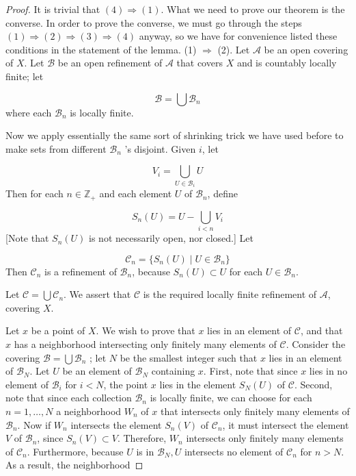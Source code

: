 \begin{proof}
 It is trivial that \((4) \Rightarrow (1)\). What we need to prove our theorem is the converse. In order to prove the converse, we must go through the steps \((1) \Rightarrow (2) \Rightarrow ( 3) \Rightarrow ( 4)\) anyway, so we have for convenience listed these conditions in the statement of the lemma.
(1) \(\Rightarrow\) (2). Let \(\mathcal{A}\) be an open covering of \(X\). Let \(\mathcal{B}\) be an open refinement of \(\mathcal{A}\) that covers \(X\) and is countably locally finite; let

\[
\mathcal{B} = \bigcup {\mathcal{B}}_{n}
\]
where each \(\mathcal{B}_{n}\) is locally finite.

Now we apply essentially the same sort of shrinking trick we have used before to make sets from different \(\mathcal{B}_{n}\) 's disjoint. Given \(i\), let

\[
V_{i} = \mathop{\bigcup }\limits_{{U \in {\mathcal{B}}_{i}}}U
\]
Then for each \(n \in {\mathbb{Z}}_{ + }\) and each element \(U\) of \(\mathcal{B}_{n}\), define

\[
S_{n}(U) = U - \mathop{\bigcup }\limits_{{i < n}}V_{i}
\]
[Note that \(S_{n}(U)\) is not necessarily open, nor closed.] Let

\[
\mathcal{C}_{n} = \{ {S_{n}(U) \mid U \in {\mathcal{B}}_{n}}\}
\]
Then \(\mathcal{C}_{n}\) is a refinement of \(\mathcal{B}_{n}\), because \(S_{n}(U) \subset U\) for each \(U \in {\mathcal{B}}_{n}\).

Let \(\mathcal{C} = \bigcup {\mathcal{C}}_{n}\). We assert that \(\mathcal{C}\) is the required locally finite refinement of \(\mathcal{A}\), covering \(X\).

Let \(x\) be a point of \(X\). We wish to prove that \(x\) lies in an element of \(\mathcal{C}\), and that \(x\) has a neighborhood intersecting only finitely many elements of \(\mathcal{C}\). Consider the covering \(\mathcal{B} = \bigcup {\mathcal{B}}_{n}\) ; let \(N\) be the smallest integer such that \(x\) lies in an element of \(\mathcal{B}_{N}\). Let \(U\) be an element of \(\mathcal{B}_{N}\) containing \(x\). First, note that since \(x\) lies in no element of \(\mathcal{B}_{i}\) for \(i < N\), the point \(x\) lies in the element \(S_{N}(U)\) of \(\mathcal{C}\). Second, note that since each collection \(\mathcal{B}_{n}\) is locally finite, we can choose for each \(n = 1,\ldots, N\) a neighborhood \(W_{n}\) of \(x\) that intersects only finitely many elements of \(\mathcal{B}_{n}\). Now if \(W_{n}\) intersects the element \(S_{n}(V)\) of \(\mathcal{C}_{n}\), it must intersect the element \(V\) of \(\mathcal{B}_{n}\), since \(S_{n}(V) \subset V\). Therefore, \(W_{n}\) intersects only finitely many elements of \(\mathcal{C}_{n}\). Furthermore, because \(U\) is in \(\mathcal{B}_{N},U\) intersects no element of \(\mathcal{C}_{n}\) for \(n > N\). As a result, the neighborhood


\end{proof}

